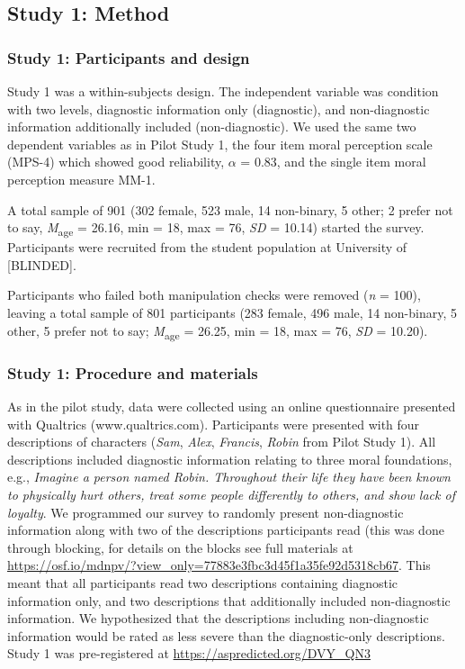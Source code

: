 \documentclass[
  english,
  man,floatsintext]{apa7}
\begin{document}
\hypertarget{study-1-method}{%
\subsection{Study 1: Method}\label{study-1-method}}

\hypertarget{study-1-participants-and-design}{%
\subsubsection{Study 1: Participants and design}\label{study-1-participants-and-design}}

Study 1 was a within-subjects design. The independent variable was condition with two levels, diagnostic information only (diagnostic), and non-diagnostic information additionally included (non-diagnostic). We used the same two dependent variables as in Pilot Study 1, the four item moral perception scale (MPS-4) which showed good reliability, \(\alpha\) = 0.83, and the single item moral perception measure MM-1.

A total sample of 901 (302 female, 523 male, 14 non-binary, 5 other; 2 prefer not to say, \emph{M}\textsubscript{age} = 26.16, min = 18, max = 76, \emph{SD} = 10.14) started the survey. Participants were recruited from the student population at University of {[}BLINDED{]}.

Participants who failed both manipulation checks were removed (\emph{n} = 100), leaving a total sample of 801 participants (283 female, 496 male, 14 non-binary, 5 other, 5 prefer not to say; \emph{M}\textsubscript{age} = 26.25, min = 18, max = 76, \emph{SD} = 10.20).

\hypertarget{study-1-procedure-and-materials}{%
\subsubsection{Study 1: Procedure and materials}\label{study-1-procedure-and-materials}}

As in the pilot study, data were collected using an online questionnaire presented with Qualtrics (www.qualtrics.com). Participants were presented with four descriptions of characters (\emph{Sam}, \emph{Alex}, \emph{Francis}, \emph{Robin} from Pilot Study 1). All descriptions included diagnostic information relating to three moral foundations, e.g., \emph{Imagine a person named Robin. Throughout their life they have been known to physically hurt others, treat some people differently to others, and show lack of loyalty}. We programmed our survey to randomly present non-diagnostic information along with two of the descriptions participants read (this was done through blocking, for details on the blocks see full materials at \color{blue}\url{https://osf.io/mdnpv/?view_only=77883e3fbc3d45f1a35fe92d5318cb67}\color{black}. This meant that all participants read two descriptions containing diagnostic information only, and two descriptions that additionally included non-diagnostic information. We hypothesized that the descriptions including non-diagnostic information would be rated as less severe than the diagnostic-only descriptions. Study 1 was pre-registered at \color{blue}\url{https://aspredicted.org/DVY_QN3}\color{black}
\end{document}
